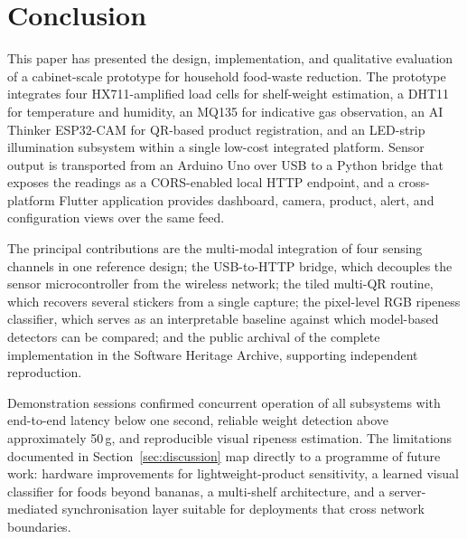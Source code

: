 \section{Conclusion}
\label{sec:conclusion}

This paper has presented the design, implementation, and qualitative
evaluation of a cabinet-scale prototype for household food-waste
reduction. The prototype integrates four HX711-amplified load cells
for shelf-weight estimation, a DHT11 for temperature and humidity, an
MQ135 for indicative gas observation, an AI Thinker ESP32-CAM for
QR-based product registration, and an LED-strip illumination
subsystem within a single low-cost integrated platform. Sensor output
is transported from an Arduino Uno over USB to a Python bridge that
exposes the readings as a CORS-enabled local HTTP endpoint, and a
cross-platform Flutter application provides dashboard, camera,
product, alert, and configuration views over the same feed.

The principal contributions are the multi-modal integration of four
sensing channels in one reference design; the USB-to-HTTP bridge,
which decouples the sensor microcontroller from the wireless network;
the tiled multi-QR routine, which recovers several stickers from a
single capture; the pixel-level RGB ripeness classifier, which serves
as an interpretable baseline against which model-based detectors can
be compared; and the public archival of the complete implementation
in the Software Heritage Archive, supporting independent
reproduction.

Demonstration sessions confirmed concurrent operation of all
subsystems with end-to-end latency below one second, reliable weight
detection above approximately 50\,g, and reproducible visual ripeness
estimation. The limitations documented in
Section~\ref{sec:discussion} map directly to a programme of future
work: hardware improvements for lightweight-product sensitivity, a
learned visual classifier for foods beyond bananas, a multi-shelf
architecture, and a server-mediated synchronisation layer suitable
for deployments that cross network boundaries.
